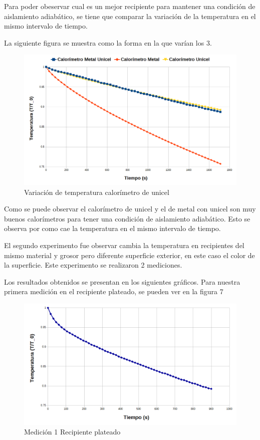 \documentclass[12pt]{article}
\begin{document}
Para poder obeservar cual es un mejor recipiente para mantener una condición de aislamiento adiabático, se tiene que comparar la variación de la temperatura en el mismo intervalo de tiempo.

La siguiente figura se muestra como la forma en la que varían los 3.

\begin{figure}[H]
\centering
\includegraphics[scale=0.4]{GraficaC.png}
\caption{Variación de temperatura calorímetro de unicel}
\end{figure}

Como se puede observar el calorímetro de unicel y el de metal con unicel son muy buenos calorímetros para tener una condición de aislamiento adiabático. Esto se observa por como cae la temperatura en el mismo intervalo de tiempo.
\pagebreak

El segundo experimento fue observar cambia la temperatura en recipientes del mismo material y grosor pero diferente superficie exterior, en este caso el color de la superficie. Este experimento se realizaron 2 mediciones.

Los resultados obtenidos se presentan en los siguientes gráficos.
Para nuestra primera medición en el recipiente plateado, se pueden ver en la figura 7

\begin{figure}[H]
\centering
\includegraphics[scale=0.4]{CM1.png}
\caption{Medición 1 Recipiente plateado}
\end{figure}
\end{document}
